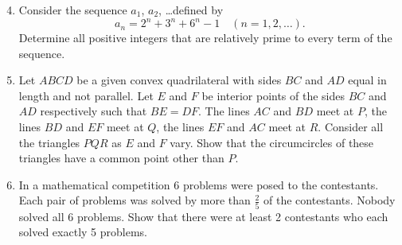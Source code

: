 \documentclass[12pt]{article}
\begin{document}
\begin{enumerate}
\setcounter{enumi}{3}
\item
Consider the sequence $a_1$, $a_2$, \dots defined by
\[
a_n = 2^n + 3^n + 6^n - 1\quad (n=1, 2, \dots).
\]
Determine all positive integers that are relatively prime to every term of 
the sequence.

\item
Let $ABCD$ be a given convex quadrilateral with sides $BC$ and $AD$ equal 
in length and not parallel. Let $E$ and $F$ be interior points of the 
sides $BC$ and $AD$ respectively such that $BE=DF$. The lines $AC$ and 
$BD$ meet at $P$, the lines $BD$ and $EF$ meet at $Q$, the lines $EF$ and 
$AC$ meet at $R$. Consider all the triangles $PQR$ as $E$ and $F$ vary. 
Show that the circumcircles of these triangles have a common point other 
than $P$.

\item
In a mathematical competition 6 problems were posed to the contestants. 
Each pair of problems was solved by more than $\frac{2}{5}$ of the 
contestants. Nobody solved all 6 problems. Show that there were at least 2 
contestants who each solved exactly 5 problems.
\end{enumerate}
\end{document}
